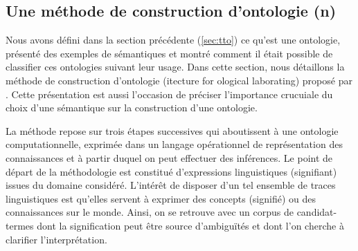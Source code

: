 \subsection{Une méthode de construction d'ontologie (n)}\label{sec:construction}
Nous avons défini dans la section précédente (\ref{sec:tto}) ce qu'est une ontologie,  présenté des exemples de sémantiques et montré comment il était possible de classifier ces ontologies suivant leur usage. 
Dans cette section, nous détaillons la méthode de construction d'ontologie  (itecture for ological laborating) proposé par \cite{Bachimont2000a}.
Cette présentation est aussi l'occasion de préciser l'importance crucuiale du choix d'une sémantique sur la construction d'une ontologie.

La méthode repose sur trois étapes successives qui aboutissent à une ontologie computationnelle, exprimée dans un langage opérationnel de représentation des connaissances et à partir duquel on peut effectuer des inférences. 
	Le point de départ de la méthodologie est constitué d'expressions linguistiques (signifiant) issues du domaine considéré.
	L'intérêt de disposer d'un tel ensemble de traces linguistiques est qu'elles servent à exprimer des concepts (signifié) ou des connaissances sur le monde. 
	Ainsi, on se retrouve avec un corpus de candidat-termes dont la signification peut être source d'ambiguïtés et dont l'on cherche à clarifier l'interprétation.
